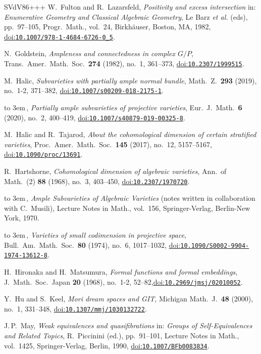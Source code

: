\documentclass[10pt,a4paper]{article}
\numberwithin{equation}{section}
\theoremstyle{definition}
\theoremstyle{remark}
\providecommand\doi[1]{\href{https://doi.org/#1}{doi:\nolinkurl{#1}}}
\providecommand\bysame{\leavevmode\hbox to 3em{\hrulefill}\,}
\begin{document}
\begin{thebibliography}{SVdV86+++}
W.~Fulton and R.~Lazarsfeld, \emph{Positivity and excess intersection} in: \emph{Enumerative Geometry and Classical Algebraic Geometry}, Le Barz \textit{et al.} (eds), pp.~97--105, Progr.\ Math., vol.~24, Birkh\"auser, Boston, MA, 1982, \doi{10.1007/978-1-4684-6726-0\_5}.

N.~Goldstein, \emph{Ampleness and connectedness in complex $G/P$}, Trans.\ Amer.\ Math.\ Soc.\ \textbf{274} (1982), no.~1, 361--373, \doi{10.2307/1999515}.

M.~Halic, \emph{Subvarieties with partially ample normal bundle}, Math.~Z.\ \textbf{293} (2019), no.~1-2, 371--382, \doi{10.1007/s00209-018-2175-1}.

\bysame,  \emph{Partially ample subvarieties of projective varieties}, Eur.~J.\ Math.\ \textbf{6} (2020), no.~2, 400--419, \doi{10.1007/s40879-019-00325-8}.

M.~Halic and R.~Tajarod, \emph{About the cohomological dimension of certain stratified varieties}, Proc.\ Amer.~Math.\ Soc.\ \textbf{145} (2017), no.~12, 5157--5167, \doi{10.1090/proc/13691}.

R.~Hartshorne,  \emph{Cohomological dimension of algebraic varieties}, Ann.\ of Math.~(2) \textbf{88} (1968), no.~3, 403--450, \doi{10.2307/1970720}.

  \bysame, \emph{Ample Subvarieties of Algebraic Varieties} (notes written in collaboration with C.~Musili), Lecture Notes in Math., vol.~156, Springer-Verlag, Berlin-New York, 1970.

  \bysame, \emph{Varieties of small codimension in projective space}, Bull.\ Am.\ Math.\ Soc.\ \textbf{80} (1974), no.~6, 1017--1032, \doi{10.1090/S0002-9904-1974-13612-8}.

H.~Hironaka and H.~Matsumura, \emph{Formal functions and formal embeddings}, J.~Math.\ Soc.\ Japan \textbf{20} (1968), no.~1-2, 52--82,\doi{10.2969/jmsj/02010052}.

Y.~Hu and S.~Keel,  \emph{Mori dream spaces and GIT}, Michigan Math.~J.\ \textbf{48} (2000), no.~1, 331--348, \doi{10.1307/mmj/1030132722}.

J.\,P.~May,  \emph{Weak equivalences and quasifibrations} in: \emph{Groups of Self-Equivalences and Related Topics}, R.~Piccinini (ed.), pp.~91--101, Lecture Notes in Math., vol.~1425, Springer-Verlag, Berlin, 1990, \doi{10.1007/BFb0083834}.


\end{thebibliography}
\end{document}

